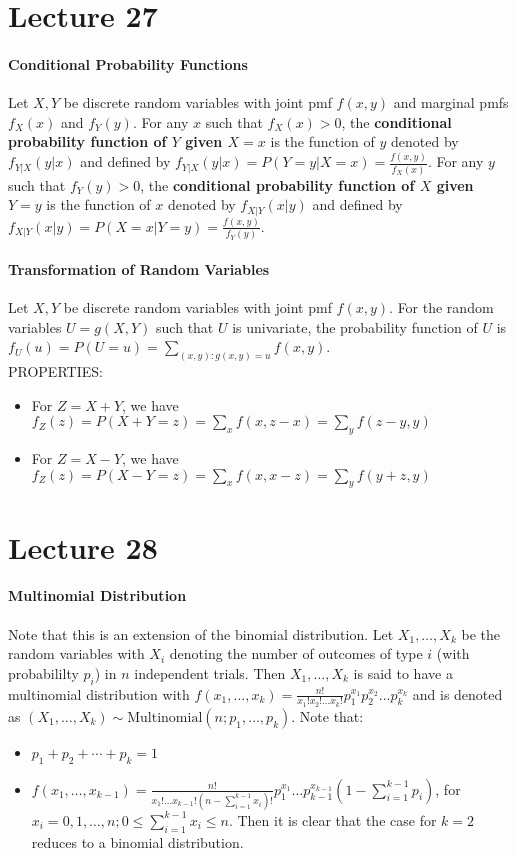 \documentclass[10pt,letter]{article}
\begin{document}
\section*{Lecture 27}
\paragraph{Conditional Probability Functions}
Let $X,Y$ be discrete random variables with joint pmf $f(x,y)$ and marginal pmfs $f_X(x)$ and $f_Y(y)$. For any $x$ such that $f_X(x)>0$, the \textbf{conditional probability function of $Y$ given $X=x$} is the function of $y$ denoted by $f_{Y|X}(y|x)$ and defined by $f_{Y|X}(y|x)=P(Y=y|X=x)=\frac{f(x,y)}{f_X(x)}$. For any $y$ such that $f_Y(y)>0$, the \textbf{conditional probability function of $X$ given $Y=y$} is the function of $x$ denoted by $f_{X|Y}(x|y)$ and defined by $f_{X|Y}(x|y)=P(X=x|Y=y)=\frac{f(x,y)}{f_Y(y)}$. 
\paragraph{Transformation of Random Variables}
Let $X,Y$ be discrete random variables with joint pmf $f(x,y)$. For the random variables $U=g(X,Y)$ such that $U$ is univariate, the probability function of $U$ is $f_U(u)=P(U=u)=\sum_{(x,y):g(x,y)=u}f(x,y)$. \\ 
PROPERTIES: 
\begin{itemize}
    \item For $Z=X+Y$, we have $f_Z(z)=P(X+Y=z)=\sum_{x}f(x,z-x)=\sum_{y}f(z-y,y)$
    \item For $Z=X-Y$, we have $f_Z(z)=P(X-Y=z)=\sum_{x}f(x,x-z)=\sum_{y}f(y+z,y)$
\end{itemize}

\section*{Lecture 28}
\paragraph{Multinomial Distribution}
Note that this is an extension of the binomial distribution. Let $X_1,\ldots,X_k$ be the random variables with $X_i$ denoting the number of outcomes of type $i$ (with probabililty $p_i$) in $n$ independent trials. Then $X_1,\ldots,X_k$ is said to have a multinomial distribution with $f(x_1,\ldots,x_k)=\frac{n!}{x_1!x_2!\ldots x_k!}p_1^{x_1}p_2^{x_2}\ldots p_k^{x_k}$ and is denoted as $(X_1,\ldots,X_k)\sim \text{Multinomial}(n;p_1,\ldots,p_k)$. Note that:
\begin{itemize}
    \item $p_1+p_2+\cdots+p_k=1$ 
    \item $f(x_1,\ldots,x_{k-1})=\frac{n!}{x_1!\ldots x_{k-1}!(n-\sum_{i=1}^{k-1}x_i)!}p_1^{x_1}\ldots p_{k-1}^{x_{k-1}}(1-\sum_{i=1}^{k-1}p_i)$, for $x_i=0,1,\ldots,n;0\leq\sum_{i=1}^{k-1}x_i\leq n$. Then it is clear that the case for $k=2$ reduces to a binomial distribution. 
\end{itemize}
\end{document}
